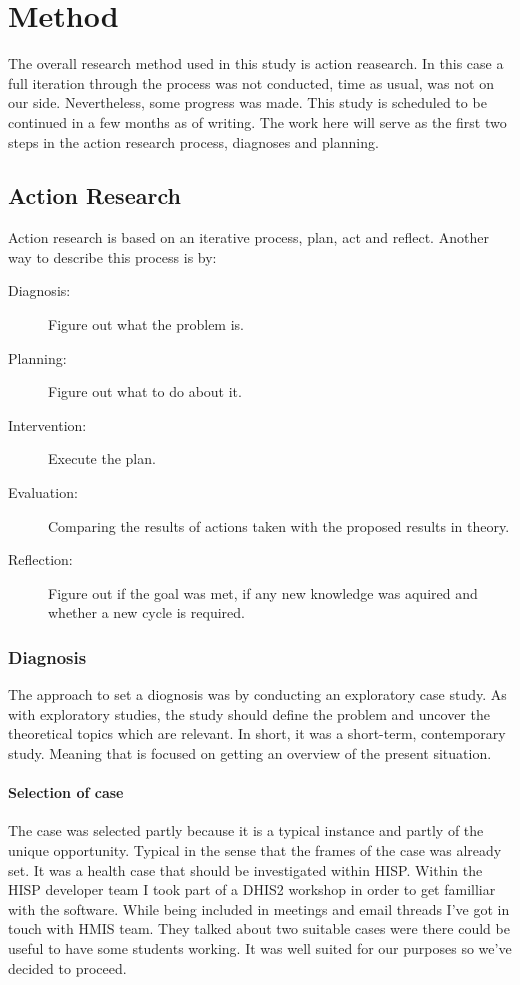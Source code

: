 \chapter{Method}
The overall research method used in this study is action reasearch.
In this case a full iteration through the process was not conducted, time as usual, was not on our side. 
Nevertheless, some progress was made. This study is scheduled to be continued in a few months as of writing.
The work here will serve as the first two steps in the action research process, diagnoses and planning.
\section{Action Research}
Action research is based on an iterative process, plan, act and reflect.
Another way to describe this process is by:
\begin{description}
\item[Diagnosis:] Figure out what the problem is.
\item[Planning:] Figure out what to do about it.
\item[Intervention:] Execute the plan.
\item[Evaluation:] Comparing the results of actions taken with the proposed results in theory.
\item[Reflection:] Figure out if the goal was met, if any new knowledge was aquired and whether a new cycle is required.
\end{description}\cite{13}
\subsection{Diagnosis}
The approach to set a diognosis was by conducting an exploratory case study. 
As with exploratory studies, the study should define the problem and uncover the theoretical topics which are relevant.
In short, it was a short-term, contemporary study. Meaning that is focused on getting an overview of the present situation.
\subsubsection{Selection of case}
The case was selected partly because it is a typical instance and partly of the unique opportunity.
Typical in the sense that the frames of the case was already set.
It was a health case that should be investigated within HISP. 
Within the HISP developer team I took part of a DHIS2 workshop in order to get familliar with the software.
While being included in meetings and email threads I've got in touch with HMIS team. 
They talked about two suitable cases were there could be useful to have some students working.
It was well suited for our purposes so we've decided to proceed.
